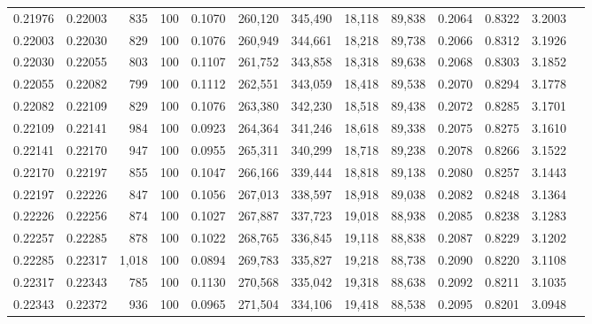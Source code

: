 \begin{tabular}{rrrrrrrrrrrrr}
0.21976 & 0.22003 &   835 & 100 &                                     0.1070 & 260,120 & 345,490 &  18,118 &  89,838 & 0.2064 & 0.8322 & 3.2003 \\
0.22003 & 0.22030 &   829 & 100 &                                     0.1076 & 260,949 & 344,661 &  18,218 &  89,738 & 0.2066 & 0.8312 & 3.1926 \\
0.22030 & 0.22055 &   803 & 100 &                                     0.1107 & 261,752 & 343,858 &  18,318 &  89,638 & 0.2068 & 0.8303 & 3.1852 \\
0.22055 & 0.22082 &   799 & 100 &                                     0.1112 & 262,551 & 343,059 &  18,418 &  89,538 & 0.2070 & 0.8294 & 3.1778 \\
0.22082 & 0.22109 &   829 & 100 &                                     0.1076 & 263,380 & 342,230 &  18,518 &  89,438 & 0.2072 & 0.8285 & 3.1701 \\
0.22109 & 0.22141 &   984 & 100 &                                     0.0923 & 264,364 & 341,246 &  18,618 &  89,338 & 0.2075 & 0.8275 & 3.1610 \\
0.22141 & 0.22170 &   947 & 100 &                                     0.0955 & 265,311 & 340,299 &  18,718 &  89,238 & 0.2078 & 0.8266 & 3.1522 \\
0.22170 & 0.22197 &   855 & 100 &                                     0.1047 & 266,166 & 339,444 &  18,818 &  89,138 & 0.2080 & 0.8257 & 3.1443 \\
0.22197 & 0.22226 &   847 & 100 &                                     0.1056 & 267,013 & 338,597 &  18,918 &  89,038 & 0.2082 & 0.8248 & 3.1364 \\
0.22226 & 0.22256 &   874 & 100 &                                     0.1027 & 267,887 & 337,723 &  19,018 &  88,938 & 0.2085 & 0.8238 & 3.1283 \\
0.22257 & 0.22285 &   878 & 100 &                                     0.1022 & 268,765 & 336,845 &  19,118 &  88,838 & 0.2087 & 0.8229 & 3.1202 \\
0.22285 & 0.22317 & 1,018 & 100 &                                     0.0894 & 269,783 & 335,827 &  19,218 &  88,738 & 0.2090 & 0.8220 & 3.1108 \\
0.22317 & 0.22343 &   785 & 100 &                                     0.1130 & 270,568 & 335,042 &  19,318 &  88,638 & 0.2092 & 0.8211 & 3.1035 \\
0.22343 & 0.22372 &   936 & 100 &                                     0.0965 & 271,504 & 334,106 &  19,418 &  88,538 & 0.2095 & 0.8201 & 3.0948 \\

\end{tabular}

